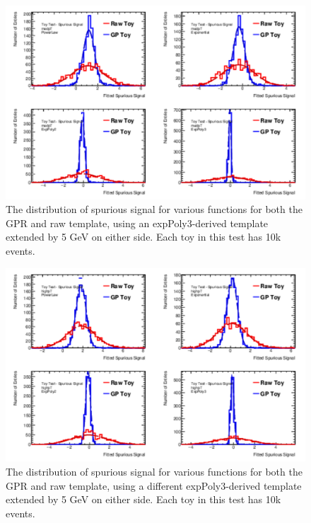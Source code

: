 \begin{figure} 
\begin{center}
  \includegraphics[width=\textwidth]{figures/background/gpr/validation/padded/ToyTest_FitSigVals_medpT_10k_noSig}   
\caption{The distribution of spurious signal for various functions for both the GPR and raw template, using an expPoly3-derived template extended by 5 GeV on either side. Each toy in this test has 10k events.}
\label{fig:padded_medpt_10k_noSig}
\end{center}
\end{figure}

\begin{figure} 
\begin{center}
  \includegraphics[width=\textwidth]{figures/background/gpr/validation/padded/ToyTest_FitSigVals_highpT_10k_noSig}   
\caption{The distribution of spurious signal for various functions for both the GPR and raw template, using a different expPoly3-derived template extended by 5 GeV on either side. Each toy in this test has 10k events.}
\label{fig:padded_highpt_10k_noSig}
\end{center}
\end{figure}

